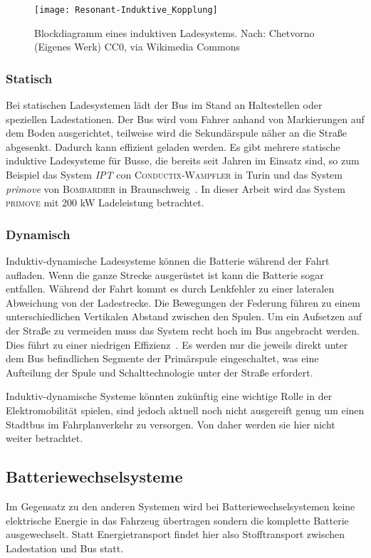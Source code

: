 \begin{figure}\centering
	\texttt{[image: Resonant-Induktive\_Kopplung]}
	\caption[Blockdiagramm eines induktiven Ladesystems]{Blockdiagramm eines induktiven Ladesystems. Nach: Chetvorno (Eigenes Werk) CC0, via Wikimedia Commons}
	\label{abb_ResIndKopplung}
\end{figure}

\subsubsection{Statisch}
Bei statischen Ladesystemen lädt der Bus im Stand an Haltestellen oder speziellen Ladestationen. Der Bus wird vom Fahrer anhand von Markierungen auf dem Boden ausgerichtet, teilweise wird die Sekundärspule näher an die Straße abgesenkt. Dadurch kann effizient geladen werden. Es gibt mehrere statische induktive Ladesysteme für Busse, die bereits seit Jahren im Einsatz sind, so zum Beispiel das System \emph{IPT} con \textsc{Conductix-Wampfler} in Turin und das System \emph{primove} von \textsc{Bombardier} in Braunschweig~\cite{WeIPT}. In dieser Arbeit wird das System \textsc{primove} mit 200 kW Ladeleistung betrachtet.

\subsubsection{Dynamisch}
Induktiv-dynamische Ladesysteme können die Batterie während der Fahrt aufladen. Wenn die ganze Strecke ausgerüstet ist kann die Batterie sogar entfallen. Während der Fahrt kommt es durch Lenkfehler zu einer lateralen Abweichung von der Ladestrecke. Die Bewegungen der Federung führen zu einem unterschiedlichen Vertikalen Abstand zwischen den Spulen. Um ein Aufsetzen auf der Straße zu vermeiden muss das System recht hoch im Bus angebracht werden. Dies führt zu einer niedrigen Effizienz~\cite{5618092}. Es werden nur die jeweils direkt unter dem Bus befindlichen Segmente der Primärspule eingeschaltet, was eine Aufteilung der Spule und Schalttechnologie unter der Straße erfordert.

Induktiv-dynamische Systeme könnten zukünftig eine wichtige Rolle in der Elektromobilität spielen, sind jedoch aktuell noch nicht ausgereift genug um einen Stadtbus im Fahrplanverkehr zu versorgen. Von daher werden sie hier nicht weiter betrachtet. 

\subsection{Batteriewechselsysteme}
Im Gegensatz zu den anderen Systemen wird bei Batteriewechselsystemen keine elektrische Energie in das Fahrzeug übertragen sondern die komplette Batterie ausgewechselt. Statt Energietransport findet hier also Stofftransport zwischen Ladestation und Bus statt. 

